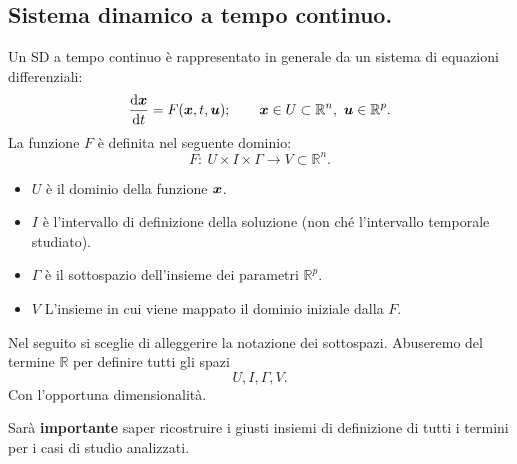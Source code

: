 \subsection{Sistema dinamico a tempo continuo.}%
\label{sub:Sistema dinamico a tempo continuo.}
Un SD a tempo continuo è rappresentato in generale da un sistema di equazioni differenziali:
\[
    \frac{\text{d} \boldsymbol{x}}{\text{d} t} = F(\boldsymbol{x}, t, \boldsymbol{u});
    \qquad 
    \boldsymbol{x}\in U \subset \mathbb{R}^n, \ \boldsymbol{u}  \in \mathbb{R}^p
.\] 
La funzione $F$ è definita nel seguente dominio:
\[
    F: \ U \times I \times \Gamma  \to V \subset \mathbb{R}^n
.\] 
\begin{itemize}
    \item $U$ è il dominio della funzione $\boldsymbol{x}$.
    \item $I$ è l'intervallo di definizione della soluzione (non ché l'intervallo temporale studiato).
    \item $\Gamma$ è il sottospazio dell'insieme dei parametri $\mathbb{R}^p$.
    \item $V$ L'insieme in cui viene mappato il dominio iniziale dalla $F$.
\end{itemize}
\begin{defn}
    Nel seguito si sceglie di alleggerire la notazione dei sottospazi. Abuseremo del termine $\mathbb{R}$ per definire tutti gli spazi
    \[
        U, I, \Gamma, V
    .\] 
    Con l'opportuna dimensionalità.
\end{defn}
\noindent
Sarà \textbf{importante} saper ricostruire i giusti insiemi di definizione di tutti i termini per i casi di studio analizzati.
